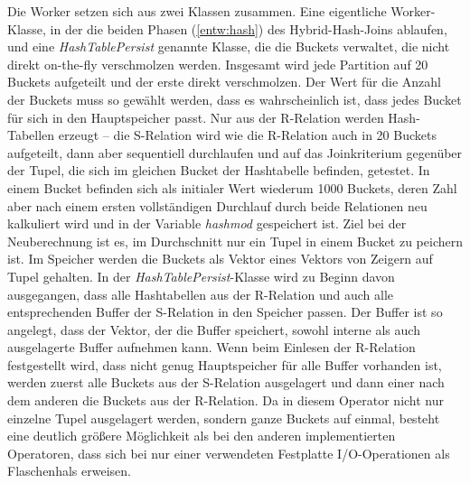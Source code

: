 \documentclass[a4paper,12pt,twoside]{article}
\newcommand{\Fb}[1]{\textit{#1}} %
\begin{document}
Die Worker setzen sich aus zwei Klassen zusammen. Eine eigentliche Worker-Klasse, in der die beiden Phasen (\autoref{entw:hash}) des Hybrid-Hash-Joins ablaufen, und eine \Fb{HashTablePersist} genannte Klasse, die die Buckets verwaltet, die nicht direkt on-the-fly verschmolzen werden. Insgesamt wird jede Partition auf 20 Buckets aufgeteilt und der erste direkt verschmolzen. Der Wert für die Anzahl der Buckets muss so gewählt werden, dass es wahrscheinlich ist, dass jedes Bucket für sich in den Hauptspeicher passt. Nur aus der R-Relation werden Hash-Tabellen erzeugt -- die S-Relation wird wie die R-Relation auch in 20 Buckets aufgeteilt, dann aber sequentiell durchlaufen und auf das Joinkriterium gegenüber der Tupel, die sich im gleichen Bucket der Hashtabelle befinden, getestet. In einem Bucket befinden sich als initialer Wert wiederum 1000 Buckets, deren Zahl aber nach einem ersten vollständigen Durchlauf durch beide Relationen neu kalkuliert wird und in der Variable \Fb{hashmod} gespeichert ist. Ziel bei der Neuberechnung ist es, im Durchschnitt nur ein Tupel in einem Bucket zu peichern ist. Im Speicher werden die Buckets als Vektor eines Vektors von Zeigern auf Tupel gehalten. In der \Fb{HashTablePersist}-Klasse wird zu Beginn davon ausgegangen, dass alle Hashtabellen aus der R-Relation und auch alle entsprechenden Buffer der S-Relation in den Speicher passen. Der Buffer ist so angelegt, dass der Vektor, der die Buffer speichert, sowohl interne als auch ausgelagerte Buffer aufnehmen kann. Wenn beim Einlesen der R-Relation festgestellt wird, dass nicht genug Hauptspeicher für alle Buffer vorhanden ist, werden zuerst alle Buckets aus der S-Relation ausgelagert und dann einer nach dem anderen die Buckets aus der R-Relation. Da in diesem Operator nicht nur einzelne Tupel ausgelagert werden, sondern ganze Buckets auf einmal, besteht eine deutlich größere Möglichkeit als bei den anderen implementierten Operatoren, dass sich bei nur einer verwendeten Festplatte I/O-Operationen als Flaschenhals erweisen. 
\end{document}
